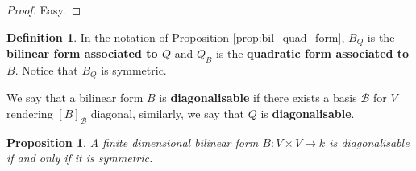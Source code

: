 \documentclass[12pt]{article}
\theoremstyle{plain}
\newtheorem{proposition}[thm]{Proposition}
\theoremstyle{definition}
\newtheorem{defn}[thm]{Definition} %
\newcommand{\scr}[1]{\mathscr{#1}}
\newcommand{\lto}{\longrightarrow}
\begin{document}
\begin{proof}
	Easy.
\end{proof}
\begin{defn}\label{def:associated_forms}
	In the notation of Proposition \ref{prop:bil_quad_form}, $B_Q$ is the \textbf{bilinear form associated to $Q$} and $Q_B$ is the \textbf{quadratic form associated to $B$}. Notice that $B_Q$ is symmetric.
	
	We say that a bilinear form $B$ is \textbf{diagonalisable} if there exists a basis $\scr{B}$ for $V$ rendering $[B]_{\scr{B}}$ diagonal, similarly, we say that $Q$ is \textbf{diagonalisable}.
	
\end{defn}
\begin{proposition}\label{prop:diagonalisable_symmetric}
	A finite dimensional bilinear form $B: V \times V \lto k$ is diagonalisable if and only if it is symmetric.
\end{proposition}
\end{document}
